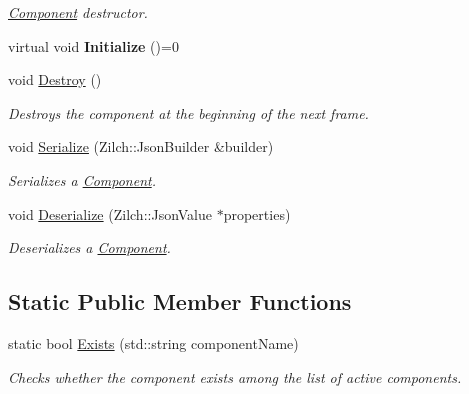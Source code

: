\begin{DoxyCompactItemize}
\begin{DoxyCompactList}\small\item\em \hyperlink{classDCEngine_1_1Component}{Component} destructor. \end{DoxyCompactList}\item 
\hypertarget{classDCEngine_1_1Component_a462cf1947b7d3f709c4825281623f05e}{virtual void {\bfseries Initialize} ()=0}\label{classDCEngine_1_1Component_a462cf1947b7d3f709c4825281623f05e}

\item 
\hypertarget{classDCEngine_1_1Component_af474d59bd4fe62ebff3fd2f308295a86}{void \hyperlink{classDCEngine_1_1Component_af474d59bd4fe62ebff3fd2f308295a86}{Destroy} ()}\label{classDCEngine_1_1Component_af474d59bd4fe62ebff3fd2f308295a86}

\begin{DoxyCompactList}\small\item\em Destroys the component at the beginning of the next frame. \end{DoxyCompactList}\item 
void \hyperlink{classDCEngine_1_1Component_a528b4171754da2aaf5ae2893c5fead7d}{Serialize} (Zilch\-::\-Json\-Builder \&builder)
\begin{DoxyCompactList}\small\item\em Serializes a \hyperlink{classDCEngine_1_1Component}{Component}. \end{DoxyCompactList}\item 
void \hyperlink{classDCEngine_1_1Component_ad1d066b15f0cf6094ff24fe53dea4ab7}{Deserialize} (Zilch\-::\-Json\-Value $\ast$properties)
\begin{DoxyCompactList}\small\item\em Deserializes a \hyperlink{classDCEngine_1_1Component}{Component}. \end{DoxyCompactList}\end{DoxyCompactItemize}
\subsection*{Static Public Member Functions}
\begin{DoxyCompactItemize}
\item 
static bool \hyperlink{classDCEngine_1_1Component_ac77fdca1c287921f639bcd93d43dc4c8}{Exists} (std\-::string component\-Name)
\begin{DoxyCompactList}\small\item\em Checks whether the component exists among the list of active components. \end{DoxyCompactList}\end{DoxyCompactItemize}
